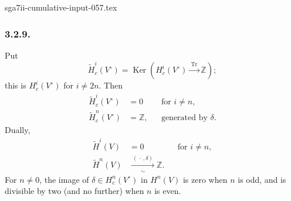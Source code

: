 \begin{filecontents*}{sga7ii-cumulative-input-057.tex}
\subsubsection*{3.2.9.}
Put
\[
\widetilde H_c^i(V^\circ)
=\operatorname{Ker}\!\left(
H_c^i(V^\circ)\xrightarrow{\ \operatorname{Tr}\ }\mathbb Z
\right);
\]
this is $H_c^i(V^\circ)$ for $i\ne2n$.  Then
\[
\begin{aligned}
\widetilde H_c^i(V^\circ)&=0 &&\text{for }i\ne n,\\
\widetilde H_c^n(V^\circ)&=\mathbb Z,
  &&\text{generated by }\delta.
\end{aligned}
\]
Dually,
\[
\begin{aligned}
\widetilde H^i(V)&=0 &&\text{for }i\ne n,\\
\widetilde H^n(V)&\xrightarrow[\sim]{\ (\,\cdot\,,\delta)\ }\mathbb Z.
\end{aligned}
\]
For $n\ne0$, the image of $\delta\in H_c^n(V^\circ)$ in $H^n(V)$
is zero when $n$ is odd, and is divisible by two (and no further)
when $n$ is even.
\end{filecontents*}
